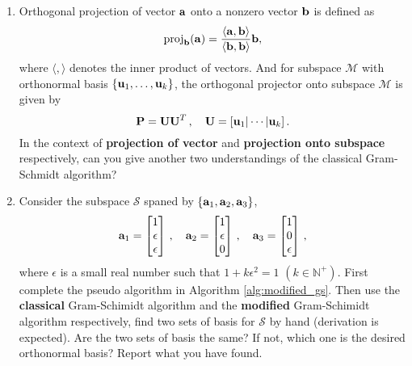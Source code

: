 \documentclass[english,onecolumn]{IEEEtran}
\begin{document}
\begin{enumerate}
\begin{algorithm}[htbp]
{ }
\end{algorithm}
	\item 
	Orthogonal projection of vector ${\bf a}$ onto a nonzero vector ${\bf b}$ is defined as
	\[
	\text{proj}_\mathbf{b}(\bf a)=\frac{\langle{\bf a},{\bf b}\rangle}{\langle{\bf b},{\bf b}\rangle}{\bf b},
	\]
	where $\langle,\rangle$ denotes the inner product of vectors.
	And for subspace $\mathcal{M}$ with 
	orthonormal basis $\{ {\bf u}_1,\ldots, {\bf u}_k \}$, the orthogonal projector onto subspace $\mathcal{M}$ is given by 
	\[
	{\bf P} = {\bf UU}^T\,,\quad {\bf U} = [{\bf u}_1|\cdots|{\bf u}_k]\,.
	\]
	In the context of \textbf{projection of vector} and \textbf{projection onto subspace} respectively, can you give another two understandings of the classical Gram-Schmidt algorithm?
	\item Consider the subspace $\mathcal{S}$ spaned by $\{{\bf a}_1, {\bf a}_2, {\bf a}_3\}$,
	\[
	{\bf a}_1 = \begin{bmatrix} 1 \\ \epsilon \\ \epsilon \\ \end{bmatrix}\,,\quad 
	{\bf a}_2 =  \begin{bmatrix}1 \\ \epsilon \\ 0\end{bmatrix}\,,\quad 
	{\bf a}_3 =  \begin{bmatrix}1 \\ 0 \\ \epsilon\end{bmatrix}\,,
	\]
	where $\epsilon$ is a small real number such that $1+k\epsilon^2 =1$ $(k\in\mathbb{N}^+)$. 
	First complete the pseudo algorithm in Algorithm \ref{alg:modified_gs}.
	Then use the \textbf{classical} Gram-Schimidt algorithm and the \textbf{modified} Gram-Schimidt algorithm respectively, find two sets of basis for $\mathcal{S}$ by hand (derivation is expected). Are the two sets of basis the same? If not, which one is the desired orthonormal basis? Report what you have found.
	\begin{algorithm}[htbp]

\end{algorithm}
\end{enumerate}
\end{document}
